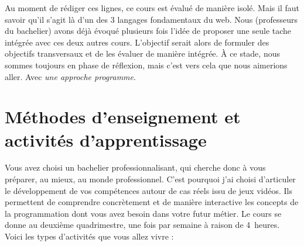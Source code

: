 Au moment de rédiger ces lignes, ce cours est évalué de manière isolé. Mais il faut savoir qu'il s'agit là d'un des 3 langages fondamentaux du web. Nous (professeurs du bachelier) avons déjà évoqué plusieurs fois l'idée de proposer une seule tache intégrée avec ces deux autres cours. L'objectif serait alors de formuler des objectifs transversaux et de les évaluer de manière intégrée. À ce stade, nous sommes toujours en phase de réflexion, mais c'est vers cela que nous aimerions aller. Avec \emph{une approche programme}.

\clearpage
\section{Méthodes d’enseignement et activités d’apprentissage}

Vous avez choisi un bachelier professionnalisant, qui cherche donc à vous préparer, au mieux, au monde professionnel. C’est pourquoi j’ai choisi d’articuler le développement de vos compétences autour de cas réels issu de jeux vidéos. Ils permettent de comprendre concrètement et de manière interactive les concepts de la programmation dont vous avez besoin dans votre futur métier. Le cours se donne au deuxième quadrimestre, une fois par semaine à raison de 4~heures. Voici les types d'activités que vous allez vivre :
